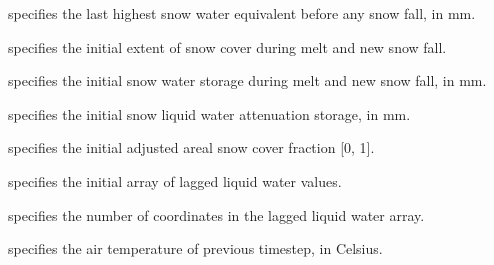   specifies the last highest snow
 water equivalent before any snow fall, in mm.

  specifies the initial extent
 of snow cover during melt and new snow fall.

  specifies the initial snow water
 storage during melt and new snow fall, in mm.

  specifies the initial snow
 liquid water attenuation storage, in mm.

  specifies the initial adjusted
 areal snow cover fraction [0, 1].

  specifies the initial array of
 lagged liquid water values.

  specifies the number of
 coordinates in the lagged liquid water array.

  specifies the air temperature
 of previous timestep, in Celsius.
 

